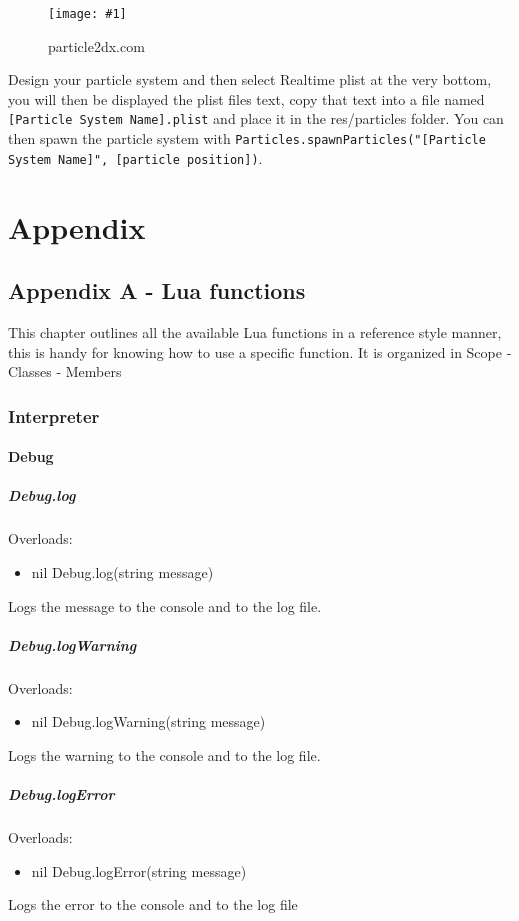 \documentclass{book}
\newenvironment{ulist}
	{\begin{itemize}
			\itemsep0em}
	{\end{itemize}}
\newcommand{\hFigure}[2]
	{\begin{figure}[ht!]
		\centering
		\texttt{[image: \#1]}
		\caption{#2}
	\end{figure}}
\begin{document}
\hFigure{ParticleCreator.png}{particle2dx.com}

Design your particle system and then select Realtime plist at the very bottom, you will then be displayed the plist files text, copy that text into a file named \texttt{[Particle System Name].plist} and place it in the res/particles folder. You can then spawn the particle system with \texttt{Particles.spawnParticles("[Particle System Name]", [particle position])}.


\part{Appendix}
\chapter{Appendix A - Lua functions}
This chapter outlines all the available Lua functions in a reference style manner, this is handy for knowing how to use a specific function. It is organized in Scope - Classes - Members
\section{Interpreter}
\subsection{Debug}
\subsubsection{Debug.log}
Overloads:
\begin{ulist}
	\item nil Debug.log(string message)
\end{ulist}
Logs the message to the console and to the log file.

\subsubsection{Debug.logWarning}
Overloads:
\begin{ulist}
	\item nil Debug.logWarning(string message)
\end{ulist}
Logs the warning to the console and to the log file.

\subsubsection{Debug.logError}
Overloads:
\begin{ulist}
	\item nil Debug.logError(string message)
\end{ulist}
Logs the error to the console and to the log file
\end{document}
